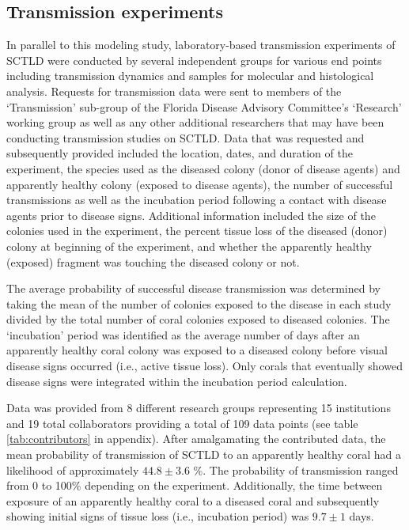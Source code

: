 \documentclass[utf8]{frontiersSCNS}
\begin{document}
\subsection{Transmission experiments}\label{sec:transmission}
In parallel to this modeling study, laboratory-based transmission experiments of SCTLD were conducted by several independent groups for various end points including transmission dynamics and samples for molecular and histological analysis. Requests for transmission data were sent to members of the ‘Transmission’ sub-group of the Florida Disease Advisory Committee’s ‘Research’ working group as well as any other additional researchers that may have been conducting transmission studies on SCTLD. Data that was requested and subsequently provided included the location, dates, and duration of the experiment, the species used as the diseased colony (donor of disease agents) and apparently healthy colony (exposed to disease agents), the number of successful transmissions as well as the incubation period following a contact with disease agents prior to disease signs. Additional information included the size of the colonies used in the experiment, the percent tissue loss of the diseased (donor) colony at beginning of the experiment, and whether the apparently healthy (exposed) fragment was touching the diseased colony or not. 

The average probability of successful disease transmission was determined by taking the mean of the number of colonies exposed to the disease in each study divided by the total number of coral colonies exposed to diseased colonies. The ‘incubation’ period was identified as the average number of days after an apparently healthy coral colony was exposed to a diseased colony before visual disease signs occurred (i.e., active tissue loss). Only corals that eventually showed disease signs were integrated within the incubation period calculation. 

Data was provided from 8 different research groups representing 15 institutions and 19 total collaborators providing a total of 109 data points (see table \ref{tab:contributors} in appendix). After amalgamating the contributed data, the mean probability of transmission of SCTLD to an apparently healthy coral had a likelihood of approximately $44.8 \pm 3.6$ \%. The probability of transmission ranged from 0 to 100\% depending on the experiment. Additionally, the time between exposure of an apparently healthy coral to a diseased coral and subsequently showing initial signs of tissue loss (i.e., incubation period) was $9.7 \pm 1$ days.  
\end{document}
